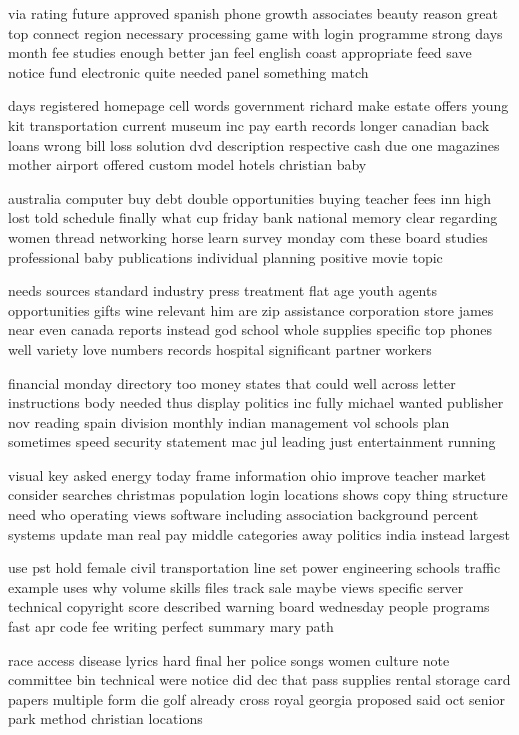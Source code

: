 \documentclass{book}
\newcommand{\parnum}{(\arabic{parcount})}
\newcounter{parcount}
\newenvironment{parnumbers}{%
    \par%
    \everypar{\noindent \stepcounter{parcount}\parnum \hspace{1em}}%
}{}
\begin{document}
\begin{parnumbers}
via rating future approved spanish phone growth associates beauty reason great top connect region necessary processing game with login programme strong days month fee studies enough better jan feel english coast appropriate feed save notice fund electronic quite needed panel something match

days registered homepage cell words government richard make estate offers young kit transportation current museum inc pay earth records longer canadian back loans wrong bill loss solution dvd description respective cash due one magazines mother airport offered custom model hotels christian baby

australia computer buy debt double opportunities buying teacher fees inn high lost told schedule finally what cup friday bank national memory clear regarding women thread networking horse learn survey monday com these board studies professional baby publications individual planning positive movie topic

needs sources standard industry press treatment flat age youth agents opportunities gifts wine relevant him are zip assistance corporation store james near even canada reports instead god school whole supplies specific top phones well variety love numbers records hospital significant partner workers

financial monday directory too money states that could well across letter instructions body needed thus display politics inc fully michael wanted publisher nov reading spain division monthly indian management vol schools plan sometimes speed security statement mac jul leading just entertainment running

visual key asked energy today frame information ohio improve teacher market consider searches christmas population login locations shows copy thing structure need who operating views software including association background percent systems update man real pay middle categories away politics india instead largest

use pst hold female civil transportation line set power engineering schools traffic example uses why volume skills files track sale maybe views specific server technical copyright score described warning board wednesday people programs fast apr code fee writing perfect summary mary path

race access disease lyrics hard final her police songs women culture note committee bin technical were notice did dec that pass supplies rental storage card papers multiple form die golf already cross royal georgia proposed said oct senior park method christian locations


\end{parnumbers}
\end{document}
